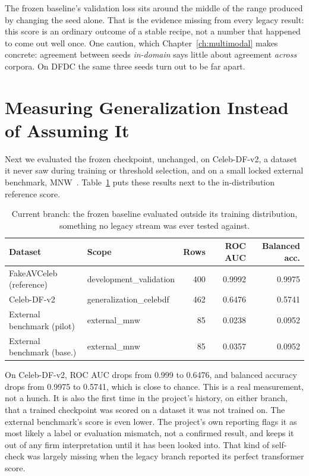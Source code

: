 The frozen baseline's validation loss sits around the middle of the range
produced by changing the seed alone. That is the evidence missing from every
legacy result: this score is an ordinary outcome of a stable recipe, not a
number that happened to come out well once. One caution, which
Chapter~\ref{ch:multimodal} makes concrete: agreement between seeds
\emph{in-domain} says little about agreement \emph{across} corpora. On DFDC the
same three seeds turn out to be far apart.

\section{Measuring Generalization Instead of Assuming It}

Next we evaluated the frozen checkpoint, unchanged, on Celeb-DF-v2, a dataset
it never saw during training or threshold selection, and on a small locked
external benchmark, MNW~\cite{mnw}. Table~\ref{tab:crossdataset} puts these
results next to the in-distribution reference score.

\begin{table}[ht]
    \centering
    \caption{Current branch: the frozen baseline evaluated outside its training distribution, something no legacy stream was ever tested against.}
    \label{tab:crossdataset}
    \begin{tabular}{llrrr}
        \toprule
        \textbf{Dataset} & \textbf{Scope} & \textbf{Rows} & \textbf{ROC AUC} & \textbf{Balanced acc.} \\
        \midrule
        FakeAVCeleb (reference)     & development\_validation & 400 & 0.9992 & 0.9975 \\
        Celeb-DF-v2                 & generalization\_celebdf & 462 & 0.6476 & 0.5741 \\
        External benchmark (pilot)  & external\_mnw           & 85  & 0.0238 & 0.0952 \\
        External benchmark (base.)  & external\_mnw           & 85  & 0.0357 & 0.0952 \\
        \bottomrule
    \end{tabular}
\end{table}

On Celeb-DF-v2, ROC AUC drops from 0.999 to 0.6476, and balanced accuracy
drops from 0.9975 to 0.5741, which is close to chance. This is a real
measurement, not a hunch. It is also the first time in the project's history,
on either branch, that a trained checkpoint was scored on a dataset it was not
trained on. The external benchmark's score is even lower. The project's own
reporting flags it as most likely a label or evaluation mismatch, not a
confirmed result, and keeps it out of any firm interpretation until it has been
looked into. That kind of self-check was largely missing when the legacy branch
reported its perfect transformer score.

